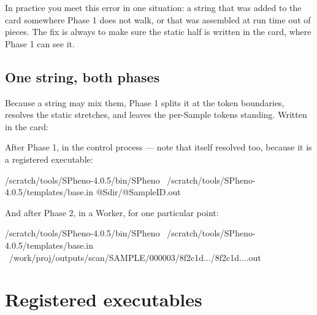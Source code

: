 \begin{terminal}
\end{terminal}

In practice you meet this error in one situation: a string that was added to the card
somewhere Phase 1 does not walk, or that was assembled at run time out of pieces. The fix
is always to make sure the static half is written in the card, where Phase 1 can see it.

\subsection*{One string, both phases}

Because a string may mix them, Phase 1 splits it at the token boundaries, resolves the
static stretches, and leaves the per-Sample tokens standing. Written in the card:

\begin{terminal}
\end{terminal}

After Phase 1, in the control process --- note that  itself resolved too,
because it is a registered executable:

\begin{terminal}
\begin{jcmd}
/scratch/tools/SPheno-4.0.5/bin/SPheno \
  /scratch/tools/SPheno-4.0.5/templates/base.in @Sdir/@SampleID.out
\end{jcmd}
\end{terminal}

And after Phase 2, in a Worker, for one particular point:

\begin{terminal}
\begin{jcmd}
/scratch/tools/SPheno-4.0.5/bin/SPheno \
  /scratch/tools/SPheno-4.0.5/templates/base.in \
  /work/proj/outputs/scan/SAMPLE/000003/8f2c1d.../8f2c1d....out
\end{jcmd}
\end{terminal}

\section{Registered executables}
\label{sec:registered}

